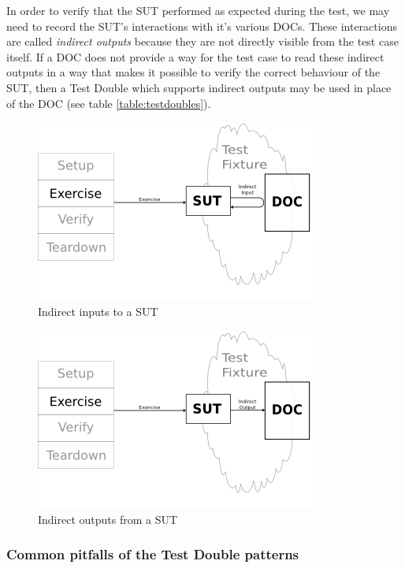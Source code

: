 In order to verify that the SUT performed as expected during the test,
we may need to record the SUT's interactions with it's various
DOCs. These interactions are called \textit{indirect outputs} because
they are not directly visible from the test case itself. If a DOC does
not provide a way for the test case to read these indirect outputs in
a way that makes it possible to verify the correct behaviour of the
SUT, then a Test Double which supports indirect outputs may be used in
place of the DOC (see table \ref{table:testdoubles}).

\begin{figure}
  \centering
  \includegraphics[scale=1.0]{img/indirect_inputs.png}
  \caption[Indirect Inputs]{Indirect inputs to a SUT\footnotemark}
  \label{fig:indirect_inputs}
\end{figure}

\begin{figure}
  \centering
  \includegraphics[scale=1.0]{img/indirect_outputs.png}
  \caption[Indirect Outputs]{Indirect outputs from a SUT\footnotemark}
  \label{fig:indirect_outputs}
\end{figure}

\subsubsection{Common pitfalls of the Test Double patterns}


